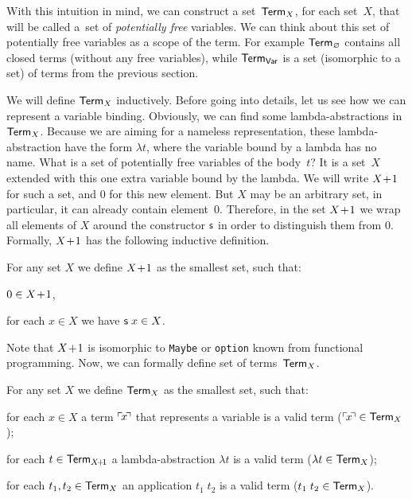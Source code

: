 With this intuition in mind, we can construct a set~$\mathsf{Term}_{X}$,
for each set~$X$, that will be called a~set of
\emph{potentially free} variables.
We can think about this set of potentially free variables
as a scope of the term.
For example $\mathsf{Term}_{\varnothing}$ contains all closed terms
(without any free variables),
while $\mathsf{Term}_{\mathsf{Var}}$ is a set (isomorphic to a set)
of terms from the previous section.

We will define $\mathsf{Term}_{X}$ inductively.
Before going into details, let us see how we can represent a variable binding.
Obviously, we can find some lambda-abstractions in $\mathsf{Term}_{X}$.
Because we are aiming for a nameless representation,
these lambda-abstraction have the form $\lambda t$,
where the variable bound by a lambda has no name.
What is a set of potentially free variables of the body~$t$?
It is a set~$X$ extended with this one extra variable bound by the lambda.
We will write $X\!+\!1$ for such a set,
and $0$ for this new element.
But $X$ may be an arbitrary set, in particular, it can already contain element~$0$.
Therefore, in the set $X\!+\!1$
we wrap all elements of $X$ around the constructor $\mathsf{s}$
in order to distinguish them from $0$.
Formally, $X\!+\!1$ has the following inductive definition.

\begin{defin}
  For any set $X$ we define $X\!+\!1$ as the smallest set, such that:
  \begin{thmenumerate}
  \item $0 \in X\!+\!1$,
  \item for each $x\in X$ we have $\mathsf{s}\;x \in X$.
  \end{thmenumerate}
\end{defin}

Note that $X\!+\!1$ is isomorphic to \texttt{Maybe} or \texttt{option}
known from functional programming.
Now, we can formally define set of terms~$\mathsf{Term}_{X}$.

\begin{defin}
  For any set $X$ we define $\mathsf{Term}_{X}$ as the smallest set, such that:
  \begin{thmenumerate}
  \item for each $x \in X$ a term $\ulcorner\! x \!\urcorner$ that represents a variable
    is a valid term ($\ulcorner\! x \!\urcorner \in \mathsf{Term}_{X}$);
  \item for each $t \in \mathsf{Term}_{X\!+\!1}$
    a lambda-abstraction $\lambda t$ is a valid term ($\lambda t \in \mathsf{Term}_{X}$);
  \item for each $t_1,t_2 \in \mathsf{Term}_{X}$ an application $t_1\;t_2$
    is a valid term ($t_1\;t_2 \in \mathsf{Term}_{X}$).
  \end{thmenumerate}
\end{defin}

